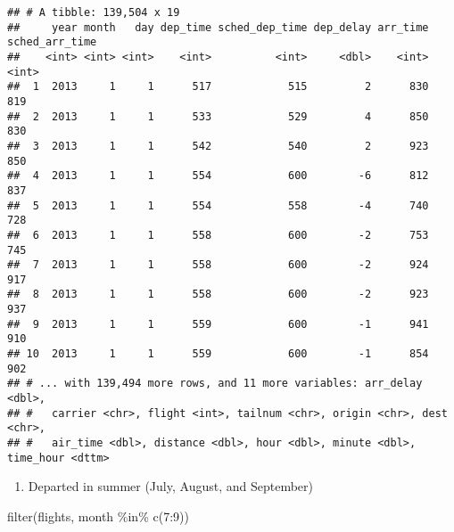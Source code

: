 \documentclass[
]{article}
\newenvironment{Shaded}{\begin{snugshade}}{\end{snugshade}}
\newcommand{\DecValTok}[1]{\textcolor[rgb]{0.00,0.00,0.81}{#1}}
\newcommand{\FunctionTok}[1]{\textcolor[rgb]{0.00,0.00,0.00}{#1}}
\newcommand{\NormalTok}[1]{#1}
\newcommand{\SpecialCharTok}[1]{\textcolor[rgb]{0.00,0.00,0.00}{#1}}
\providecommand{\tightlist}{%
  \setlength{\itemsep}{0pt}\setlength{\parskip}{0pt}}
\begin{document}
\begin{verbatim}
## # A tibble: 139,504 x 19
##     year month   day dep_time sched_dep_time dep_delay arr_time sched_arr_time
##    <int> <int> <int>    <int>          <int>     <dbl>    <int>          <int>
##  1  2013     1     1      517            515         2      830            819
##  2  2013     1     1      533            529         4      850            830
##  3  2013     1     1      542            540         2      923            850
##  4  2013     1     1      554            600        -6      812            837
##  5  2013     1     1      554            558        -4      740            728
##  6  2013     1     1      558            600        -2      753            745
##  7  2013     1     1      558            600        -2      924            917
##  8  2013     1     1      558            600        -2      923            937
##  9  2013     1     1      559            600        -1      941            910
## 10  2013     1     1      559            600        -1      854            902
## # ... with 139,494 more rows, and 11 more variables: arr_delay <dbl>,
## #   carrier <chr>, flight <int>, tailnum <chr>, origin <chr>, dest <chr>,
## #   air_time <dbl>, distance <dbl>, hour <dbl>, minute <dbl>, time_hour <dttm>
\end{verbatim}

\begin{enumerate}
\def\labelenumi{\arabic{enumi}.}
\setcounter{enumi}{3}
\tightlist
\item
  Departed in summer (July, August, and September)
\end{enumerate}

\begin{Shaded}
\begin{Highlighting}[]
\FunctionTok{filter}\NormalTok{(flights, month }\SpecialCharTok{\%in\%} \FunctionTok{c}\NormalTok{(}\DecValTok{7}\SpecialCharTok{:}\DecValTok{9}\NormalTok{))}
\end{Highlighting}
\end{Shaded}
\end{document}
